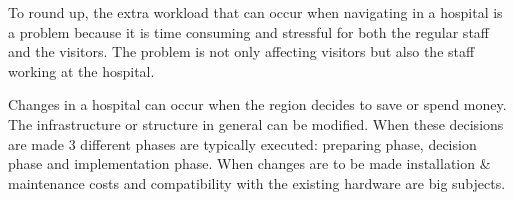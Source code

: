 To round up, the extra workload that can occur when navigating in a hospital is a problem because it is time consuming and stressful for both the regular staff and the visitors. The problem is not only affecting visitors but also the staff working at the hospital. 

Changes in a hospital can occur when the region decides to save or spend money. The infrastructure or structure in general can be modified. When these decisions are made 3 different phases are typically executed: preparing phase, decision phase and implementation phase. When changes are to be made installation \& maintenance costs and compatibility with the existing hardware are big subjects.


